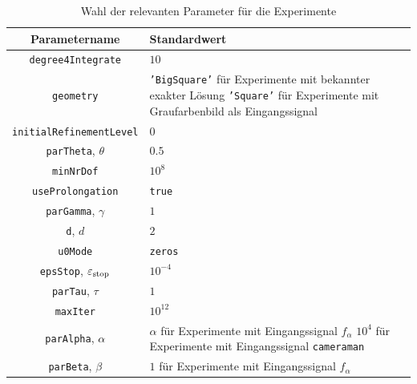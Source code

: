 \begin{table}[p]
  \centering
  \begin{tabular}{c|p{9.5cm}}
    \hline 
    Parametername & Standardwert\\
    \hline 
    \texttt{degree4Integrate}&
    $10$\\
    \texttt{geometry} &
    \texttt{'BigSquare'} für Experimente mit bekannter exakter Lösung \newline
    \texttt{'Square'} für Experimente mit Graufarbenbild als Eingangssignal\\
    \texttt{initialRefinementLevel} &
    $0$\\
    \texttt{parTheta}, $\theta$ &
    $0.5$\\
    \texttt{minNrDof} &
    $10^8$\\
    \texttt{useProlongation} &
    \texttt{true}\\
    \texttt{parGamma}, $\gamma$ &
    $1$\\
    \texttt{d}, $d$ &
    $2$\\
    \texttt{u0Mode} &
    \texttt{zeros}\\
    \texttt{epsStop}, $\varepsilon_{\textup{stop}}$ &
    $10^{-4}$\\
    \texttt{parTau}, $\tau$ &
    $1$\\
    \texttt{maxIter} &
    $10^{12}$\\
    \texttt{parAlpha}, $\alpha$ &
    $\alpha$ für Experimente mit Eingangssignal $f_\alpha$\newline
    $10^4$ für Experimente mit Eingangssignal \texttt{cameraman} \\
    \texttt{parBeta}, $\beta$ &
    $1$ für Experimente mit Eingangssignal $f_\alpha$\\
    \hline
  \end{tabular}
  \caption{Wahl der relevanten Parameter für die Experimente}
  \label{tab:parameterStandardValues}
\end{table} 
